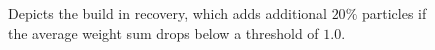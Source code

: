 \begin{figure}
{  \label{fig:algo_recovery_withRecovery}
}
\caption {Depicts the build in recovery, which adds additional $20\%$ particles if the average weight sum drops below a threshold of $1.0$.}
\label{fig:algo_recovery}

\end{figure}

